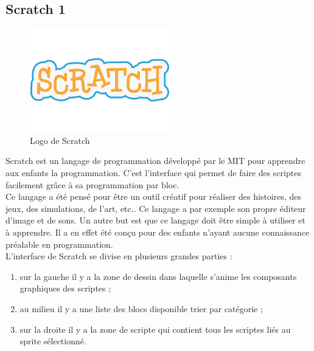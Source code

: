 \subsection{Scratch 1}
\begin{figure}[!h]
  \begin{center}
    \includegraphics[scale=0.4]{content/5-related_work/images/scratch}
    \caption{Logo de Scratch}
    \label{fig:scratch}
  \end{center}
\end{figure}
Scratch est un langage de programmation développé par le MIT pour apprendre aux enfants la programmation. C'est l'interface qui permet de faire des scriptes facilement grâce à sa programmation par bloc.\\

Ce langage a été pensé pour être un outil créatif pour réaliser des histoires, des jeux, des simulations, de l'art, etc.. Ce langage a par exemple son propre éditeur d'image et de sons. Un autre but est que ce langage doit être simple à utiliser et à apprendre. Il a en effet été conçu pour des enfants n'ayant aucune connaissance préalable en programmation.\\

L'interface de Scratch se divise en plusieurs grandes parties :

\begin{enumerate}
\item sur la gauche il y a la zone de dessin dans laquelle s'anime les composants graphiques des scriptes ;
\item au milieu il y a une liste des blocs disponible trier par catégorie ;
\item sur la droite il y a la zone de scripte qui contient tous les scriptes liés au sprite sélectionné.
\end{enumerate}

